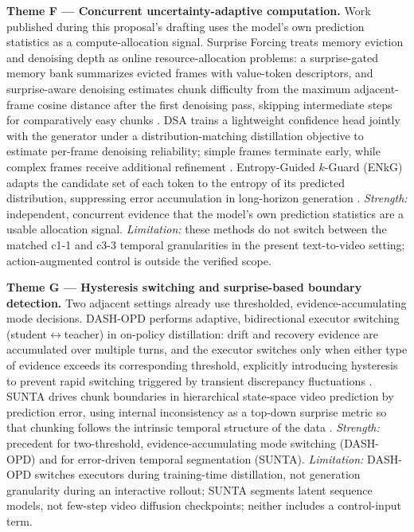 \documentclass[11pt,a4paper]{article}
\begin{document}
\textbf{Theme F --- Concurrent uncertainty-adaptive computation.}
Work published during this proposal's drafting uses the model's own prediction statistics as a compute-allocation signal. Surprise Forcing treats memory eviction and denoising depth as online resource-allocation problems: a surprise-gated memory bank summarizes evicted frames with value-token descriptors, and surprise-aware denoising estimates chunk difficulty from the maximum adjacent-frame cosine distance after the first denoising pass, skipping intermediate steps for comparatively easy chunks \parencite{shiSurpriseForcingWhat2026}. DSA trains a lightweight confidence head jointly with the generator under a distribution-matching distillation objective to estimate per-frame denoising reliability; simple frames terminate early, while complex frames receive additional refinement \parencite{leDSADynamicStep2026}. Entropy-Guided $k$-Guard (ENkG) adapts the candidate set of each token to the entropy of its predicted distribution, suppressing error accumulation in long-horizon generation \parencite{hanEntropyGuidedKGuard2026}. \emph{Strength:} independent, concurrent evidence that the model's own prediction statistics are a usable allocation signal. \emph{Limitation:} these methods do not switch between the matched c1-1 and c3-3 temporal granularities in the present text-to-video setting; action-augmented control is outside the verified scope.

\textbf{Theme G --- Hysteresis switching and surprise-based boundary detection.}
Two adjacent settings already use thresholded, evidence-accumulating mode decisions. DASH-OPD performs adaptive, bidirectional executor switching (student$\leftrightarrow$teacher) in on-policy distillation: drift and recovery evidence are accumulated over multiple turns, and the executor switches only when either type of evidence exceeds its corresponding threshold, explicitly introducing hysteresis to prevent rapid switching triggered by transient discrepancy fluctuations \parencite{xiaDASHOPDDiscrepancy2026}. SUNTA drives chunk boundaries in hierarchical state-space video prediction by prediction error, using internal inconsistency as a top-down surprise metric so that chunking follows the intrinsic temporal structure of the data \parencite{iiyamaSUNTAHierarchical2026}. \emph{Strength:} precedent for two-threshold, evidence-accumulating mode switching (DASH-OPD) and for error-driven temporal segmentation (SUNTA). \emph{Limitation:} DASH-OPD switches executors during training-time distillation, not generation granularity during an interactive rollout; SUNTA segments latent sequence models, not few-step video diffusion checkpoints; neither includes a control-input term.
\end{document}
